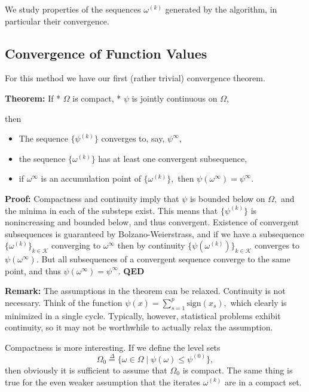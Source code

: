 \documentclass[
  12pt,
]{book}
\providecommand{\tightlist}{%
  \setlength{\itemsep}{0pt}\setlength{\parskip}{0pt}}
\begin{document}
We study properties of the sequences \(\omega^{(k)}\) generated by the algorithm,
in particular their convergence.

\hypertarget{convergence-of-function-values}{%
\subsection{Convergence of Function Values}\label{convergence-of-function-values}}

For this method we have our first (rather trivial) convergence theorem.

\textbf{Theorem:} If
* \(\Omega\) is compact,
* \(\psi\) is jointly continuous on \(\Omega\),

then

\begin{itemize}
\tightlist
\item
  The sequence \(\{\psi^{(k)}\}\) converges to, say, \(\psi^\infty,\)
\item
  the sequence \(\{\omega^{(k)}\}\) has at least one convergent subsequence,
\item
  if \(\omega^\infty\) is an accumulation point of \(\{\omega^{(k)}\},\) then \(\psi(\omega^\infty)=\psi^\infty.\)
\end{itemize}

\textbf{Proof:}
Compactness and continuity imply that \(\psi\) is bounded
below on \(\Omega,\) and the minima
in each of the substeps exist. This means that \(\{\psi^{(k)}\}\)
is nonincreasing and bounded below, and thus convergent. Existence
of convergent subsequences is guaranteed by Bolzano-Weierstrass,
and if we have a subsequence \(\{\omega^{(k)}\}_{k\in\mathcal{K}}\)
converging to \(\omega^\infty\) then by continuity \(\{\psi(\omega^{(k)})\}_{k\in\mathcal{K}}\)
converges to \(\psi(\omega^\infty).\) But all subsequences of a convergent
sequence converge to the same point, and thus \(\psi(\omega^\infty)=\psi^\infty.\)
\textbf{QED}

\textbf{Remark:} The assumptions in the theorem can be relaxed. Continuity is not
necessary. Think of the function \(\psi(x)=\sum_{s=1}^p\text{sign}(x_s),\)
which clearly is minimized in a single cycle. Typically, however, statistical
problems exhibit continuity, so it may not be worthwhile to actually relax the assumption.

Compactness is more interesting. If we define the level sets
\[
\Omega_0\mathop{=}\limits^{\Delta}\{\omega\in\Omega\mid\psi(\omega)\leq\psi^{(0)}\},
\]
then obviously it is sufficient to assume that \(\Omega_0\) is
compact. The same thing is true for the even weaker assumption
that the iterates \(\omega^{(k)}\) are in a compact set.
\end{document}
